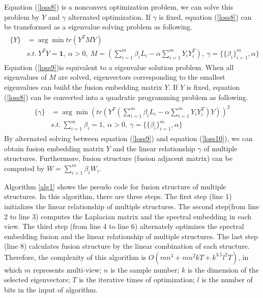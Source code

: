 \documentclass[review]{elsarticle}
\begin{document}
Equation (\ref{loss8}) is a nonconvex optimization problem, we can solve this problem by $Y$ and $\gamma$ alternated optimization. If $\gamma$ is fixed, equation (\ref{loss8}) can be transformed as a eigenvalue solving problem as following.
\begin{align}
\label{loss9}
\begin{aligned}
\{Y\}&=\arg \min tr(Y^{T}MY)\\
&s.t.\ Y^{T}Y=\mathbf{1},\ \alpha >0,\ M=(\sum_{i=1}^{m}\beta_{i}L_{i}-\alpha\sum_{i=1}^{m}Y_{i}Y_{i}^{T}),\ \gamma=\{\{\beta_{i}\}_{i=1}^{m},\alpha\}
\end{aligned}
\end{align}
Equation (\ref{loss9})is equivalent to a eigenvalue solution problem. When all eigenvalues of $M$ are solved, eigenvectors corresponding to the smallest eigenvalues can build the fusion embedding matrix $Y$. If $Y$ is fixed, equation (\ref{loss8}) can be converted into a quadratic programming problem as following.
\begin{align}
\label{loss10}
\begin{aligned}
\{\gamma\}&=\arg \min (tr(Y^{T}(\sum_{i=1}^{m}\beta_{i}L_{i}-\alpha\sum_{i=1}^{m}Y_{i}Y_{i}^{T})Y))^2\\
&s.t.\ \sum_{i=1}^{m}\beta_{i}=1,\ \alpha >0,\ \gamma=\{\{\beta_{i}\}_{i=1}^{m},\alpha\}
\end{aligned}
\end{align}
By alternated solving between equation (\ref{loss9}) and equation (\ref{loss10}), we can obtain fusion embedding matrix $Y$ and the linear relationship $\gamma$ of multiple structures. Furthermore, fusion structure (fusion adjacent matrix) can be computed by $W=\sum_{i=1}^{m}\beta_{i}W_{i}$.

Algorithm \ref{alg1} shows the pseudo code for fusion structure of multiple structures. In this algorithm, there are three steps. The first step (line 1) initializes the linear relationship of multiple structures. The second step(from line 2 to line 3) computes the Laplacian matrix and the spectral embedding in each view. The third step (from line 4 to line 6) alternately optimizes the spectral embedding fusion and the linear relationship of multiple structures. The last step (line 8) calculates fusion structure by the linear combination of each structure. Therefore, the complexity of this algorithm is $O(mn^{3}+mn^{2}kT+k^{3.5}l^{2}T)$, in which $m$ represents multi-view; $n$ is the sample number; $k$ is the dimension of the selected eigenvectors; $T$ is the iterative times of optimization; $l$ is the number of bits in the input of algorithm.
\end{document}
